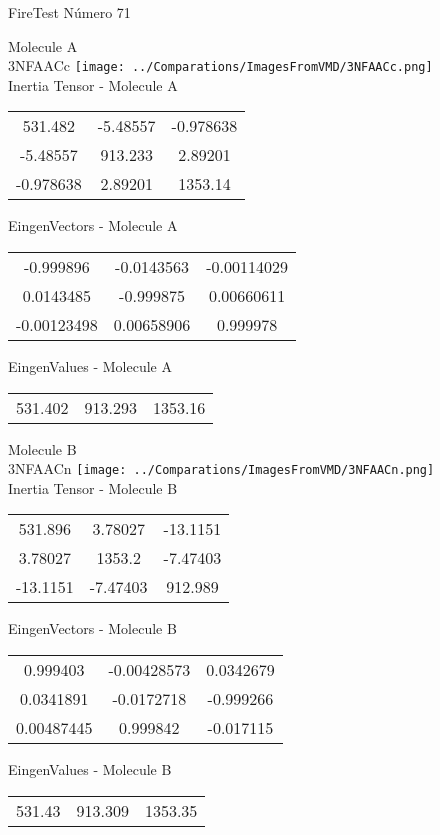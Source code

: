 \vtab[-2cm]
\begin{center}
{\large FireTest \tab Número 71}
\end{center}
\begin{multicols}{2}
\begin{center}

Molecule A \\ 
3NFAACc
\texttt{[image: ../Comparations/ImagesFromVMD/3NFAACc.png]}
\\
Inertia Tensor - Molecule A \\
\vtab

\begin{tabular}{|c c c|}
531.482	 & 	-5.48557	 & 	-0.978638	 \\
-5.48557	 & 	913.233	 & 	2.89201	 \\
-0.978638	 & 	2.89201	 & 	1353.14
\end{tabular}

\vtab
 EingenVectors - Molecule A     \\
\vtab
\begin{tabular}{|c c c|}
-0.999896	 & 	-0.0143563	 & 	-0.00114029	 \\
0.0143485	 & 	-0.999875	 & 	0.00660611	 \\
-0.00123498	 & 	0.00658906	 & 	0.999978
\end{tabular}

\vtab
 EingenValues - Molecule A     \\
\vtab
\begin{tabular}{|c c c|}
531.402	 & 	913.293	 & 	1353.16	 \\
\end{tabular}
\columnbreak

Molecule B \\ 
3NFAACn
\texttt{[image: ../Comparations/ImagesFromVMD/3NFAACn.png]}
\\
Inertia Tensor - Molecule B \\
\vtab

\begin{tabular}{|c c c|}
531.896	 & 	3.78027	 & 	-13.1151	 \\
3.78027	 & 	1353.2	 & 	-7.47403	 \\
-13.1151	 & 	-7.47403	 & 	912.989
\end{tabular}

\vtab
 EingenVectors - Molecule B     \\
\vtab
\begin{tabular}{|c c c|}
0.999403	 & 	-0.00428573	 & 	0.0342679	 \\
0.0341891	 & 	-0.0172718	 & 	-0.999266	 \\
0.00487445	 & 	0.999842	 & 	-0.017115
\end{tabular}

\vtab
 EingenValues - Molecule B     \\
\vtab
\begin{tabular}{|c c c|}
531.43	 & 	913.309	 & 	1353.35	 \\
\end{tabular}

\end{center}
\end{multicols}
